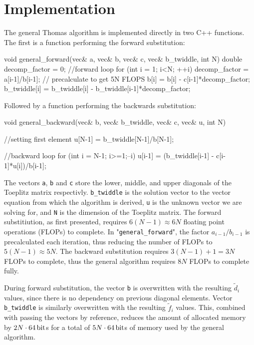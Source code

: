 \documentclass[english,notitlepage,reprint,nofootinbib]{revtex4-1}  %
\begin{document}
\newpage


\section{Implementation} \label{sec:III}
The general Thomas algorithm is implemented directly in two C++ functions. The first is a function performing the forward substitution:
\begin{cpp}
void general_forward(vec& a, vec& b, vec& c, vec& b_twiddle, int N)
{
  double decomp_factor = 0;
  //forward loop
  for (int i = 1; i<N; ++i){
    decomp_factor = a[i-1]/b[i-1];  // precalculate to get 5N FLOPS
    b[i] = b[i] - c[i-1]*decomp_factor;
    b_twiddle[i] = b_twiddle[i] - b_twiddle[i-1]*decomp_factor;
  }
}
\end{cpp}
Followed by a function performing the backwards substitution:
\begin{cpp}
void general_backward(vec& b, vec& b_twiddle, vec& c, vec& u, int N)
{
  //setting first element
  u[N-1] = b_twiddle[N-1]/b[N-1];

  //backward loop
  for (int i = N-1; i>=1;--i){
    u[i-1] = (b_twiddle[i-1] - c[i-1]*u[i])/b[i-1];
  }
}
\end{cpp}
The vectors \verb+a+, \verb+b+ and \verb+c+ store the lower, middle, and upper diagonals of the Toeplitz matrix respectivly. \verb+b_twiddle+ is the solution vector to the vector equation from which the algorithm is derived, \verb+u+ is the unknown vector we are solving for, and \verb+N+ is the dimension of the Toeplitz matrix. The forward substitiution, as first presented, requires \(6(N-1)\approx 6N\) floating point operations (FLOPs) to complete. In "\verb+general_forward+", the factor \(a_{i-1}/b_{i-1}\) is precalculated each iteration, thus reducing the number of FLOPs to \(5(N-1)\approx 5N\). The backward substitution requires \(3(N-1)+1 = 3N\) FLOPs to complete, thus the general algorithm requires \(8N\) FLOPs to complete fully.

During forward substitution, the vector \verb+b+ is overwritten with the resulting \(\tilde{d}_{i}\) values, since there is no dependency on previous diagonal elements. Vector \verb+b_twiddle+ is similarly overwritten with the resulting \(\tilde{f}_{i}\) values. This, combined with passing the vectors by reference, reduces the amount of allocated memory by \(2N\cdot \SI{64}{\bit}\)s for a total of \(5N\cdot \SI{64}{\bit}\)s of memory used by the general algorithm.
\end{document}
